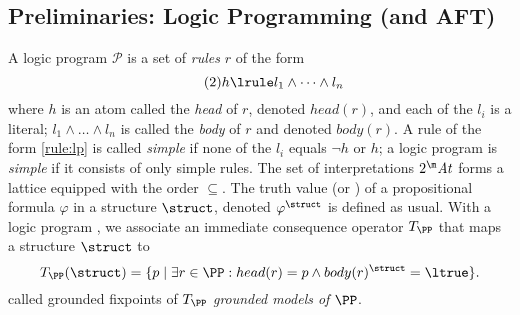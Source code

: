 


\subsection{Preliminaries: Logic Programming (and AFT)}
\renewcommand\voc\atoms
A logic program $\mathcal{P}$ is a set of \emph{rules} $r$ of the form 
\begin{equation}
 \tag{2}h\lrule l_1\land \dots \land l_n \label{rule:lp}
\end{equation}
where
$h$ is an atom called the \emph{head} of $r$, denoted $head(r)$, and each of the $l_i$ is a literal; $ l_1\land \dots \land l_n$ is called  the \emph{body} of $r$ and denoted $body(r)$.
A rule of the form \eqref{rule:lp} is called \emph{simple} if none of the $l_i$ equals $\lnot h$ or $h$; a logic program is \emph{simple} if it consists of only simple rules.
The set of interpretations $2^\voc$ forms a lattice equipped with the order $\subseteq$. 
The truth value (\ltrue or \lfalse) of a propositional formula $\varphi$ in a structure $\struct$, denoted $\varphi^\struct$ is defined as usual.
With a logic program \PP, we associate an immediate consequence operator \cite{jacm/EmdenK76} $T_\PP$ that maps a structure $\struct$ to 
	\[T_\PP(\struct) = \{p\mid \exists r \in \PP: head(r)=p\land body(r)^\struct=\ltrue\}.\] 
	 called grounded fixpoints of $T_\PP$ \emph{grounded models of $\PP$}. 
	
